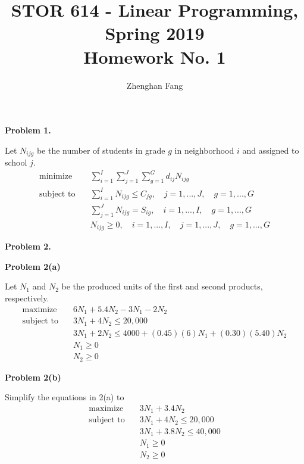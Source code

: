 \documentclass[12pt]{article}
\def\name{Zhenghan Fang}
\begin{document}
 
 
\title{STOR 614 - Linear Programming, Spring 2019 \\
Homework No. 1}
\author{\name}

\maketitle

\noindent
\textbf{Problem 1.}

Let $N_{ijg}$ be the number of students in grade $g$ in neighborhood $i$ and assigned to school $j$. 
\begin{align*}
    \text{minimize} \quad & \sum_{i=1}^{I}\sum_{j=1}^J \sum_{g=1}^{G} d_{ij}N_{ijg} \\
    \text{subject to} \quad & \sum_{i=1}^I N_{ijg} \le C_{jg}, \quad j=1,...,J, \quad g=1,...,G \\
    & \sum_{j=1}^J N_{ijg} = S_{ig}, \quad i=1,...,I, \quad g=1,...,G  \\
    & N_{ijg} \ge 0, \quad i=1,...,I, \quad j=1,...,J, \quad g=1,...,G  
\end{align*}

\noindent
\textbf{Problem 2.}

\textbf{Problem 2(a)}

Let $N_1$ and $N_2$ be the produced units of the first and second products, respectively.
\begin{align*}
    \text{maximize} \quad & 6N_1 + 5.4N_2 - 3N_1 - 2N_2 \\
    \text{subject to} \quad & 3N_1 + 4N_2 \le 20,000 \\
    & 3N_1 + 2N_2 \le 4000 + (0.45)(6)N_1 + (0.30)(5.40)N_2 \\
    & N_1 \ge 0 \\
    & N_2 \ge 0
\end{align*}

\textbf{Problem 2(b)}

Simplify the equations in 2(a) to
\begin{align*}
    \text{maximize} \quad & 3N_1 + 3.4N_2 \\
    \text{subject to} \quad & 3N_1 + 4N_2 \le 20,000 \\
    & 3N_1 + 3.8N_2 \le 40,000 \\
    & N_1 \ge 0 \\
    & N_2 \ge 0
\end{align*}
\end{document}

